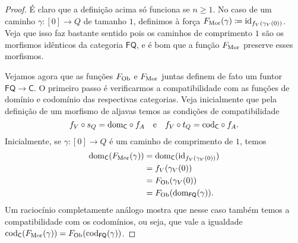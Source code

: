 \begin{proof}
    É claro que a definição acima só funciona se $n \geq 1$.
    No caso de um caminho $\gamma: [0] \to Q$ de tamanho $1$, definimos à força $F_{\mathrm{Mor}}(\gamma) \coloneqq \mathrm{id}_{f_V(\gamma_V(0))}$.
    Veja que isso faz bastante sentido pois os caminhos de comprimento $1$ são os morfismos idênticos da categoria $\mathsf{FQ}$, e é bom que a função $F_{\mathrm{Mor}}$ preserve esses morfismos.

    Vejamos agora que as funções $F_{\mathrm{Ob}}$ e $F_{\mathrm{Mor}}$ juntas definem de fato um funtor $\mathsf{FQ} \to \mathsf{C}$.
    O primeiro passo é verificarmos a compatibilidade com as funções de domínio e codomínio das respectivas categorias.
    Veja inicialmente que pela definição de um morfismo de aljavas temos as condições de compatibilidade
    \begin{displaymath}
        f_V \circ s_Q = \mathrm{dom}_{\mathsf{C}} \circ f_A
        \quad \text{e} \quad
        f_V \circ t_Q = \mathrm{cod}_{\mathsf{C}} \circ f_A.
    \end{displaymath}
    Inicialmente, se $\gamma: [0] \to Q$ é um caminho de comprimento de $1$, temos
    \begin{align*}
        \mathrm{dom}_{\mathsf{C}}(F_{\mathrm{Mor}}(\gamma))
        & = \mathrm{dom}_{\mathsf{C}}(\mathrm{id}_{f_V(\gamma_V(0))}) \\
        & = f_V(\gamma_V(0)) \\
        & = F_{\mathrm{Ob}}(\gamma_V(0)) \\
        & = F_{\mathrm{Ob}}(\mathrm{dom}_{\mathsf{FQ}}(\gamma)).
    \end{align*}
    Um raciocínio completamente análogo mostra que nesse caso também temos a compatibilidade com os codomínios, ou seja, que vale a igualdade $\mathrm{cod}_{\mathsf{C}}(F_{\mathrm{Mor}}(\gamma)) = F_{\mathrm{Ob}}(\mathrm{cod}_{\mathsf{FQ}}(\gamma))$.


\end{proof}
